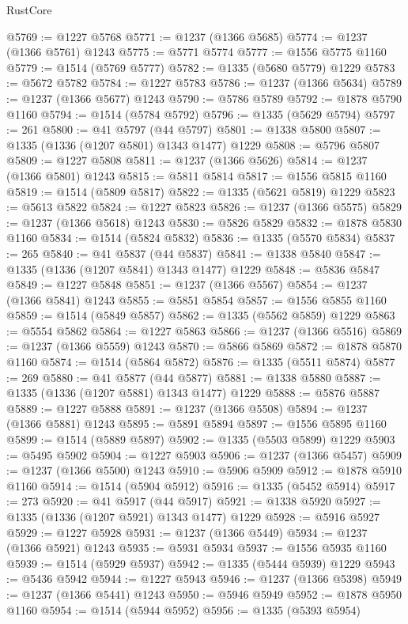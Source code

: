 \begin{lexlean}{RustCore}
\begin{coremodule}
@5769 := @1227 @5768
@5771 := @1237 (@1366 @5685)
@5774 := @1237 (@1366 @5761) @1243
@5775 := @5771 @5774
@5777 := @1556 @5775 @1160
@5779 := @1514 (@5769 @5777)
@5782 := @1335 (@5680 @5779) @1229
@5783 := @5672 @5782
@5784 := @1227 @5783
@5786 := @1237 (@1366 @5634)
@5789 := @1237 (@1366 @5677) @1243
@5790 := @5786 @5789
@5792 := @1878 @5790 @1160
@5794 := @1514 (@5784 @5792)
@5796 := @1335 (@5629 @5794)
@5797 := 261
@5800 := @41 @5797 (@44 @5797)
@5801 := @1338 @5800
@5807 := @1335 (@1336 (@1207 @5801) @1343 @1477) @1229
@5808 := @5796 @5807
@5809 := @1227 @5808
@5811 := @1237 (@1366 @5626)
@5814 := @1237 (@1366 @5801) @1243
@5815 := @5811 @5814
@5817 := @1556 @5815 @1160
@5819 := @1514 (@5809 @5817)
@5822 := @1335 (@5621 @5819) @1229
@5823 := @5613 @5822
@5824 := @1227 @5823
@5826 := @1237 (@1366 @5575)
@5829 := @1237 (@1366 @5618) @1243
@5830 := @5826 @5829
@5832 := @1878 @5830 @1160
@5834 := @1514 (@5824 @5832)
@5836 := @1335 (@5570 @5834)
@5837 := 265
@5840 := @41 @5837 (@44 @5837)
@5841 := @1338 @5840
@5847 := @1335 (@1336 (@1207 @5841) @1343 @1477) @1229
@5848 := @5836 @5847
@5849 := @1227 @5848
@5851 := @1237 (@1366 @5567)
@5854 := @1237 (@1366 @5841) @1243
@5855 := @5851 @5854
@5857 := @1556 @5855 @1160
@5859 := @1514 (@5849 @5857)
@5862 := @1335 (@5562 @5859) @1229
@5863 := @5554 @5862
@5864 := @1227 @5863
@5866 := @1237 (@1366 @5516)
@5869 := @1237 (@1366 @5559) @1243
@5870 := @5866 @5869
@5872 := @1878 @5870 @1160
@5874 := @1514 (@5864 @5872)
@5876 := @1335 (@5511 @5874)
@5877 := 269
@5880 := @41 @5877 (@44 @5877)
@5881 := @1338 @5880
@5887 := @1335 (@1336 (@1207 @5881) @1343 @1477) @1229
@5888 := @5876 @5887
@5889 := @1227 @5888
@5891 := @1237 (@1366 @5508)
@5894 := @1237 (@1366 @5881) @1243
@5895 := @5891 @5894
@5897 := @1556 @5895 @1160
@5899 := @1514 (@5889 @5897)
@5902 := @1335 (@5503 @5899) @1229
@5903 := @5495 @5902
@5904 := @1227 @5903
@5906 := @1237 (@1366 @5457)
@5909 := @1237 (@1366 @5500) @1243
@5910 := @5906 @5909
@5912 := @1878 @5910 @1160
@5914 := @1514 (@5904 @5912)
@5916 := @1335 (@5452 @5914)
@5917 := 273
@5920 := @41 @5917 (@44 @5917)
@5921 := @1338 @5920
@5927 := @1335 (@1336 (@1207 @5921) @1343 @1477) @1229
@5928 := @5916 @5927
@5929 := @1227 @5928
@5931 := @1237 (@1366 @5449)
@5934 := @1237 (@1366 @5921) @1243
@5935 := @5931 @5934
@5937 := @1556 @5935 @1160
@5939 := @1514 (@5929 @5937)
@5942 := @1335 (@5444 @5939) @1229
@5943 := @5436 @5942
@5944 := @1227 @5943
@5946 := @1237 (@1366 @5398)
@5949 := @1237 (@1366 @5441) @1243
@5950 := @5946 @5949
@5952 := @1878 @5950 @1160
@5954 := @1514 (@5944 @5952)
@5956 := @1335 (@5393 @5954)

\end{coremodule}
\end{lexlean}
